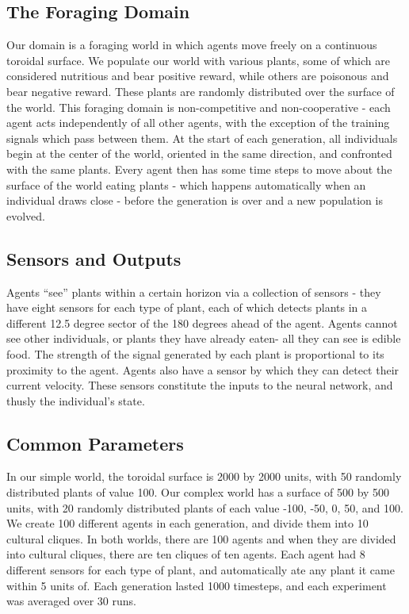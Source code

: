 \documentclass{acm_proc_article-sp}
\begin{document}
\subsection*{The Foraging Domain}
    Our domain is a foraging world in which agents move freely on a continuous toroidal surface. We populate our world with various plants, some of which are considered nutritious and bear positive reward, while others are poisonous and bear negative reward. These plants are randomly distributed over the surface of the world. This foraging domain is non-competitive and non-cooperative - each agent acts independently of all other agents, with the exception of the training signals which pass between them. At the start of each generation, all individuals begin at the center of the world, oriented in the same direction, and confronted with the same plants. Every agent then has some time steps to move about the surface of the world eating plants - which happens automatically when an individual draws close - before the generation is over and a new population is evolved.
    
\subsection*{Sensors and Outputs}

  Agents ``see'' plants within a certain horizon via a collection of sensors - they have eight sensors for each type of plant, each of which detects plants in a different 12.5 degree sector of the 180 degrees ahead of the agent. Agents cannot see other individuals, or plants they have already eaten- all they can see is edible food. The strength of the signal generated by each plant is proportional to its proximity to the agent. Agents also have a sensor by which they can detect their current velocity. These sensors constitute the inputs to the neural network, and thusly the individual's state.


\subsection*{Common Parameters}

In our simple world, the toroidal surface is 2000 by 2000 units, with 50 randomly distributed plants of value 100. Our complex world has a surface of 500 by 500 units, with 20 randomly distributed plants of each value -100, -50, 0, 50, and 100. We create 100 different agents in each generation,  and divide them into 10 cultural cliques. In both worlds, there are 100 agents and when they are divided into cultural cliques, there are ten cliques of ten agents. Each agent had 8 different sensors for each type of plant, and automatically ate any plant it came within 5 units of. Each generation lasted 1000 timesteps, and each experiment was averaged over 30 runs.
\end{document}
